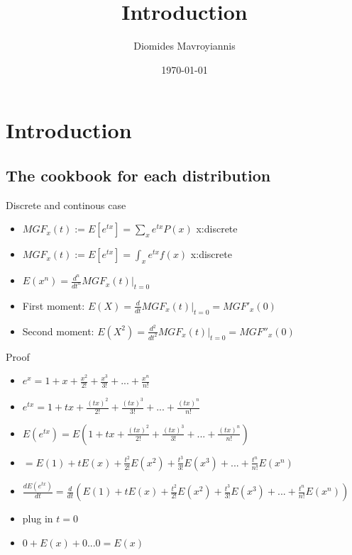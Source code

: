 \documentclass{beamer}
\title[Aspects of probability]{Introduction}
\author{ Diomides Mavroyiannis} %
\institute[London Mathematical Laboratory, Dauphine] 
{
London Mathematical Laboratory, PSL/Paris Dauphine \\ 
\medskip
}
\date{\today}
\numberwithin{equation}{section}
\begin{document}
\begin{frame}
\titlepage %
\end{frame}

\setcounter{tocdepth}{1}
\section{Introduction}

\subsection{The cookbook for each distribution}
\begin{frame}{Discrete and continous case}
\begin{itemize}
    \item $MGF_x(t):=E[e^{tx}]= \sum_x e^{tx} P(x)$ x:discrete
    \item $MGF_x(t):=E[e^{tx}]= \int_x e^{tx} f(x)$ x:discrete
    \item $E(x^n) = \frac{d^n}{dt^{n}} MGF_x(t) |_{t=0}$
    \item First moment: $E(X) = \frac{d}{dt} MGF_x(t) |_{t=0} = MGF'_x(0)$
    \item Second moment: $E(X^2) = \frac{d^2}{dt^{2}} MGF_x(t) |_{t=0} = MGF''_x(0)$
\end{itemize}
\end{frame}

\begin{frame}{Proof}
\begin{itemize}
    \item $e^x= 1+x+ \frac{x^2}{2!}+\frac{x^3}{3!}+...+\frac{x^n}{n!} $ 
    \item $e^{tx}= 1+tx+ \frac{(tx)^2}{2!}+\frac{(tx)^3}{3!}+...+\frac{(tx)^n}{n!} $ 
    \item $E(e^{tx}) = E(1+tx+ \frac{(tx)^2}{2!}+\frac{(tx)^3}{3!}+...+\frac{(tx)^n}{n!})$
    \item $= E(1)+tE(x)+ \frac{t^2}{2!}E(x^2)+\frac{t^3}{3!}E(x^3)+...+\frac{t^n}{n!}E(x^n)$
    \item $\frac{d E(e^{tx})}{dt} = \frac{d}{dt}(E(1)+tE(x)+ \frac{t^2}{2!}E(x^2)+\frac{t^3}{3!}E(x^3)+...+\frac{t^n}{n!}E(x^n))$
    \item plug in $t=0$
    \item $0 + E(x)+0...0 =E(x) $  
\end{itemize}
\end{frame}
\end{document}
